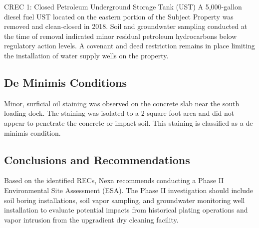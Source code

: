 \begin{infobox}{CREC 1: Closed Petroleum Underground Storage Tank (UST)}
A 5,000-gallon diesel fuel UST located on the eastern portion of the Subject Property was removed and clean-closed in 2018. Soil and groundwater sampling conducted at the time of removal indicated minor residual petroleum hydrocarbons below regulatory action levels. A covenant and deed restriction remains in place limiting the installation of water supply wells on the property.
\end{infobox}

\subsection*{De Minimis Conditions}
Minor, surficial oil staining was observed on the concrete slab near the south loading dock. The staining was isolated to a 2-square-foot area and did not appear to penetrate the concrete or impact soil. This staining is classified as a de minimis condition.

\subsection*{Conclusions and Recommendations}
Based on the identified RECs, Nexa recommends conducting a Phase II Environmental Site Assessment (ESA). The Phase II investigation should include soil boring installations, soil vapor sampling, and groundwater monitoring well installation to evaluate potential impacts from historical plating operations and vapor intrusion from the upgradient dry cleaning facility.
\newpage

